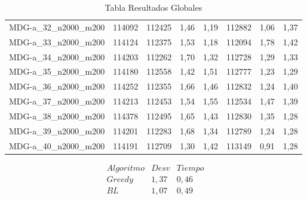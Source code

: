 \begin{table}[H]
{\begin{tabular}{@{}cccccccc@{}}
			MDG-a\_32\_n2000\_m200 & 114092               & 112425          & 1,46           & 1,19                 & 112882      & 1,06           & 1,37             \\
			MDG-a\_33\_n2000\_m200 & 114124               & 112375          & 1,53           & 1,18                 & 112094      & 1,78           & 1,42             \\
			MDG-a\_34\_n2000\_m200 & 114203               & 112262          & 1,70           & 1,32                 & 112728      & 1,29           & 1,33             \\
			MDG-a\_35\_n2000\_m200 & 114180               & 112558          & 1,42           & 1,51                 & 112777      & 1,23           & 1,29             \\
			MDG-a\_36\_n2000\_m200 & 114252               & 112355          & 1,66           & 1,46                 & 112832      & 1,24           & 1,40             \\
			MDG-a\_37\_n2000\_m200 & 114213               & 112453          & 1,54           & 1,55                 & 112534      & 1,47           & 1,39             \\
			MDG-a\_38\_n2000\_m200 & 114378               & 112495          & 1,65           & 1,43                 & 112830      & 1,35           & 1,28             \\
			MDG-a\_39\_n2000\_m200 & 114201               & 112283          & 1,68           & 1,34                 & 112789      & 1,24           & 1,28             \\
			MDG-a\_40\_n2000\_m200 & 114191               & 112709          & 1,30           & 1,42                 & 113149      & 0,91           & 1,28             \\ \bottomrule
		\end{tabular}%
	}
	\caption{Tabla Resultados Globales}
	\label{tab:global}
\end{table}




\[
\begin{array}{r|*{4}{r}}{Algoritmo}&Desv&Tiempo\\\hline
{}Greedy&1,37&0,46\\

{}BL&1,07&0,49

\end{array}
\]



\newpage






